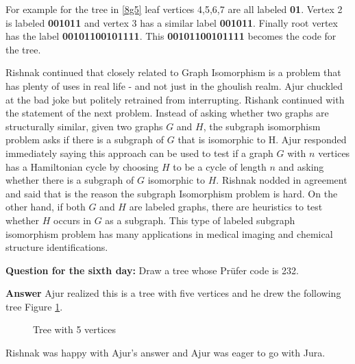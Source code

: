 For example for the tree in \ref{8g5} leaf vertices 4,5,6,7 are all labeled \textbf{01}. Vertex 2 is labeled \textbf{001011} and vertex 3 has a similar label \textbf{001011}. Finally root vertex has the label \textbf{00101100101111}. This \textbf{00101100101111} becomes the code for the tree.

Rishnak continued that closely related to Graph Isomorphism is a problem that has plenty of uses in real life - and not just in the ghoulish realm. Ajur chuckled at the bad joke but politely retrained from interrupting. Rishank continued with the statement of the next problem.  Instead of asking whether two graphs are structurally similar, given two graphs $G$ and $H$, the subgraph isomorphism problem asks if there is a subgraph of $G$ that is isomorphic to H. Ajur responded immediately saying this approach can be used to test if a graph $G$ with $n$ vertices has a Hamiltonian cycle by choosing $H$ to be a cycle of length $n$ and asking whether there is a subgraph of $G$ isomorphic to $H$. Rishnak nodded in agreement and said that is the reason the subgraph Isomorphism problem is hard. On the other hand, if both $G$ and $H$ are labeled graphs, there are heuristics to test whether $H$ occurs in $G$ as a subgraph. This type of labeled subgraph isomorphism problem has many applications in medical imaging and chemical structure identifications.

\textbf{Question for the sixth day:} Draw a tree whose Pr{\"u}fer code is 232.

\textbf{Answer} Ajur realized this is a tree with five vertices and he drew the following tree Figure \ref{6q1}.
\begin{figure}
\begin{center}


\caption{Tree with 5 vertices}\label{6q1}
\end{center}
\end{figure}

Rishnak was happy with Ajur's answer and Ajur was eager to go with Jura.
